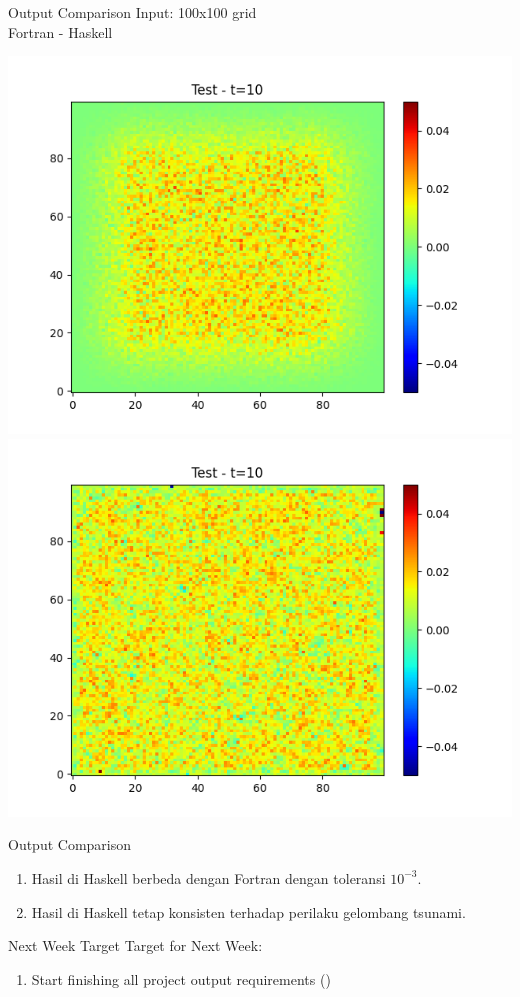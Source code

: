 \documentclass{beamer}
\begin{document}
\begin{frame}{Output Comparison}
    Input: 100x100 grid\\
    Fortran - Haskell
    \begin{center}
        \includegraphics[scale=0.32]{figure/frame_10.png}
        \includegraphics[scale=0.32]{figure/frame_2_10.png}
    \end{center}
\end{frame}

\begin{frame}{Output Comparison}
    \begin{enumerate}
        \item Hasil di Haskell berbeda dengan Fortran dengan toleransi $10^{-3}$.
        \item Hasil di Haskell tetap konsisten terhadap perilaku gelombang tsunami.
    \end{enumerate}
\end{frame}


\begin{frame}{Next Week Target}
    Target for Next Week:
    \begin{enumerate}
        \item Start finishing all project output requirements ()
    \end{enumerate}
\end{frame}
\end{document}
